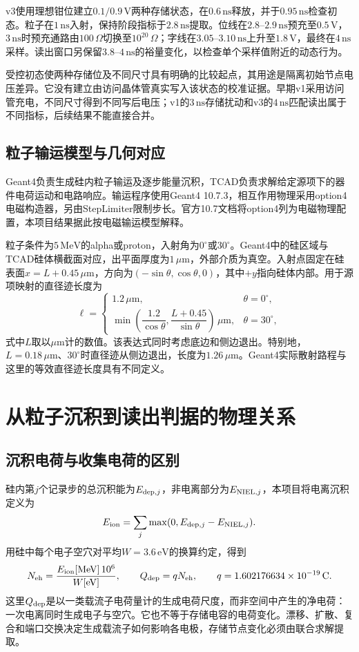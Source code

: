\documentclass[UTF8,a4paper,zihao=-4,fontset=fandol]{ctexart}
\newcommand{\um}{\,\mu\mathrm{m}}
\newcommand{\ns}{\,\mathrm{ns}}
\newcommand{\V}{\,\mathrm{V}}
\begin{document}
v3使用理想钳位建立$0.1/0.9\V$两种存储状态，在$0.6\ns$释放，并于$0.95\ns$检查初态。粒子在$1\ns$入射，保持阶段指标于$2.8\ns$提取。位线在$2.8$--$2.9\ns$预充至$0.5\V$，$3\ns$时预充通路由$100\,\Omega$切换至$10^{20}\,\Omega$；字线在$3.05$--$3.10\ns$上升至$1.8\V$，最终在$4\ns$采样。读出窗口另保留$3.8$--$4\ns$的裕量变化，以检查单个采样值附近的动态行为。

受控初态使两种存储位及不同尺寸具有明确的比较起点，其用途是隔离初始节点电压差异。它没有建立由访问晶体管真实写入该状态的校准证据。早期v1采用访问管充电，不同尺寸得到不同写后电压；v1的$3\ns$存储扰动和v3的$4\ns$匹配读出属于不同指标，后续结果不能直接合并\cite{v1}。

\subsection{粒子输运模型与几何对应}
Geant4负责生成硅内粒子输运及逐步能量沉积，TCAD负责求解给定源项下的器件电荷运动和电路响应。输运程序使用Geant4 10.7.3，相互作用物理采用option4电磁构造器，另由StepLimiter限制步长。官方10.7文档将option4列为电磁物理配置\cite{g4em}，本项目结果据此按电磁输运模型解释。

粒子条件为$5\,\mathrm{MeV}$的alpha或proton，入射角为$0^\circ$或$30^\circ$。Geant4中的硅区域与TCAD硅体横截面对应，出平面厚度为$1\um$，外部介质为真空。入射点固定在硅表面$x=L+0.45\um$，方向为$(-\sin\theta,\cos\theta,0)$，其中$+y$指向硅体内部。用于源项映射的直径迹长度为
\begin{equation}
\ell=\begin{cases}
1.2\um,&\theta=0^\circ,\\
\min\!\left(\dfrac{1.2}{\cos\theta},\dfrac{L+0.45}{\sin\theta}\right)\um,&\theta=30^\circ,
\end{cases}
\label{eq:track}
\end{equation}
式中$L$取以$\mu\mathrm{m}$计的数值。该表达式同时考虑底边和侧边退出。特别地，$L=0.18\um$、$30^\circ$时直径迹从侧边退出，长度为$1.26\um$。Geant4实际散射路程与这里的等效直径迹长度具有不同定义。

\section{从粒子沉积到读出判据的物理关系}
\subsection{沉积电荷与收集电荷的区别}
硅内第$j$个记录步的总沉积能为$E_{{\rm dep},j}$，非电离部分为$E_{{\rm NIEL},j}$，本项目将电离沉积定义为
\begin{equation}
E_{\rm ion}=\sum_j\max(0,E_{{\rm dep},j}-E_{{\rm NIEL},j}).
\end{equation}
用硅中每个电子空穴对平均$W=3.6\,\mathrm{eV}$的换算约定\cite{ryder2021}，得到
\begin{equation}
N_{\rm eh}=\frac{E_{\rm ion}[\mathrm{MeV}]\,10^6}{W[\mathrm{eV}]},\qquad
Q_{\rm dep}=qN_{\rm eh},\qquad q=1.602176634\times10^{-19}\,\mathrm{C}.
\label{eq:qdep}
\end{equation}
这里$Q_{\rm dep}$是以一类载流子电荷量计的生成电荷尺度，而非空间中产生的净电荷：一次电离同时生成电子与空穴。它也不等于存储电容的电荷变化。漂移、扩散、复合和端口交换决定生成载流子如何影响各电极\cite{label1996}，存储节点变化必须由联合求解提取。
\end{document}
